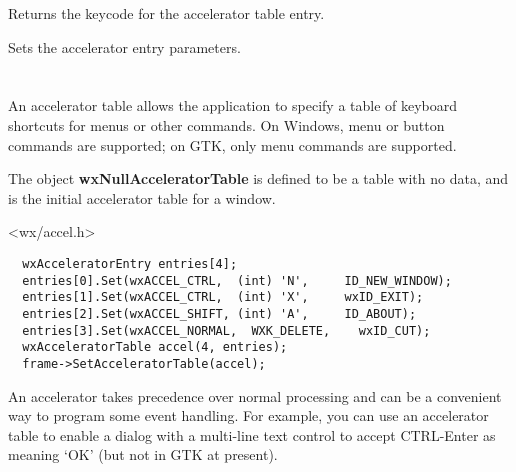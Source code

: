 
Returns the keycode for the accelerator table entry.

\label{wxacceleratorentryset}


Sets the accelerator entry parameters.





\section{}\label{wxacceleratortable}

An accelerator table allows the application to specify a table of keyboard shortcuts for
menus or other commands. On Windows, menu or button commands are supported; on GTK,
only menu commands are supported.

The object {\bf wxNullAcceleratorTable} is defined to be a table with no data, and is the
initial accelerator table for a window.




<wx/accel.h>


{\small%
\begin{verbatim}
  wxAcceleratorEntry entries[4];
  entries[0].Set(wxACCEL_CTRL,  (int) 'N',     ID_NEW_WINDOW);
  entries[1].Set(wxACCEL_CTRL,  (int) 'X',     wxID_EXIT);
  entries[2].Set(wxACCEL_SHIFT, (int) 'A',     ID_ABOUT);
  entries[3].Set(wxACCEL_NORMAL,  WXK_DELETE,    wxID_CUT);
  wxAcceleratorTable accel(4, entries);
  frame->SetAcceleratorTable(accel);
\end{verbatim}
}


An accelerator takes precedence over normal processing and can be a convenient way to program some event handling.
For example, you can use an accelerator table to enable a dialog with a multi-line text control to
accept CTRL-Enter as meaning `OK' (but not in GTK at present).

